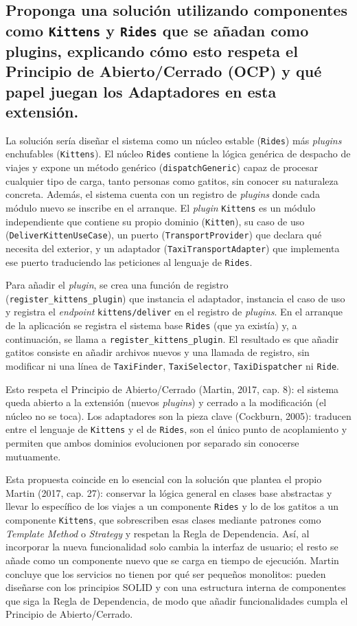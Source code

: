 \documentclass[11pt,a4paper]{article}
\begin{document}
\subsection*{Proponga una solución utilizando componentes como \texttt{Kittens} y \texttt{Rides} que se añadan como plugins, explicando cómo esto respeta el Principio de Abierto/Cerrado (OCP) y qué papel juegan los Adaptadores en esta extensión.}

La solución sería diseñar el sistema como un núcleo estable (\texttt{Rides}) más
\emph{plugins} enchufables (\texttt{Kittens}). El núcleo \texttt{Rides} contiene la lógica
genérica de despacho de viajes y expone un método genérico (\texttt{dispatchGeneric}) capaz de
procesar cualquier tipo de carga, tanto personas como gatitos, sin conocer su naturaleza
concreta. Además, el sistema cuenta con un registro de \emph{plugins} donde cada módulo nuevo
se inscribe en el arranque. El \emph{plugin} \texttt{Kittens} es un módulo independiente que
contiene su propio dominio (\texttt{Kitten}), su caso de uso (\texttt{DeliverKittenUseCase}),
un puerto (\texttt{TransportProvider}) que declara qué necesita del exterior, y un adaptador
(\texttt{TaxiTransportAdapter}) que implementa ese puerto traduciendo las peticiones al
lenguaje de \texttt{Rides}.

Para añadir el \emph{plugin}, se crea una función de registro
(\texttt{register\_kittens\_plugin}) que instancia el adaptador, instancia el caso de uso y
registra el \emph{endpoint} \texttt{kittens/deliver} en el registro de \emph{plugins}. En el
arranque de la aplicación se registra el sistema base \texttt{Rides} (que ya existía) y, a
continuación, se llama a \texttt{register\_kittens\_plugin}. El resultado es que añadir gatitos
consiste en añadir archivos nuevos y una llamada de registro, sin modificar ni una línea de
\texttt{TaxiFinder}, \texttt{TaxiSelector}, \texttt{TaxiDispatcher} ni \texttt{Ride}.

Esto respeta el Principio de Abierto/Cerrado (Martin, 2017, cap. 8): el sistema queda abierto a
la extensión (nuevos \emph{plugins}) y cerrado a la modificación (el núcleo no se toca). Los
adaptadores son la pieza clave (Cockburn, 2005): traducen entre el lenguaje de \texttt{Kittens}
y el de \texttt{Rides}, son el único punto de acoplamiento y permiten que ambos dominios
evolucionen por separado sin conocerse mutuamente.

Esta propuesta coincide en lo esencial con la solución que plantea el propio Martin (2017,
cap. 27): conservar la lógica general en clases base abstractas y llevar lo específico de los
viajes a un componente \texttt{Rides} y lo de los gatitos a un componente \texttt{Kittens}, que
sobrescriben esas clases mediante patrones como \emph{Template Method} o \emph{Strategy} y
respetan la Regla de Dependencia. Así, al incorporar la nueva funcionalidad solo cambia la
interfaz de usuario; el resto se añade como un componente nuevo que se carga en tiempo de
ejecución. Martin concluye que los servicios no tienen por qué ser pequeños monolitos: pueden
diseñarse con los principios SOLID y con una estructura interna de componentes que siga la Regla
de Dependencia, de modo que añadir funcionalidades cumpla el Principio de Abierto/Cerrado.
\end{document}
